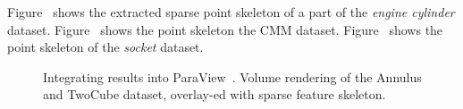 Figure~ shows the extracted sparse point skeleton of a part of the \emph{engine cylinder} dataset. Figure~ shows the point skeleton the CMM dataset. Figure~ shows the point skeleton of the \emph{socket} dataset.
 \begin{figure}
    \centering
    \vspace {-3mm}
    \caption{Integrating results into ParaView~\cite{Ayachit2015}. Volume rendering of the Annulus and TwoCube dataset, overlay-ed with sparse feature skeleton.}
    \label{fig:paraview}
\end{figure}

